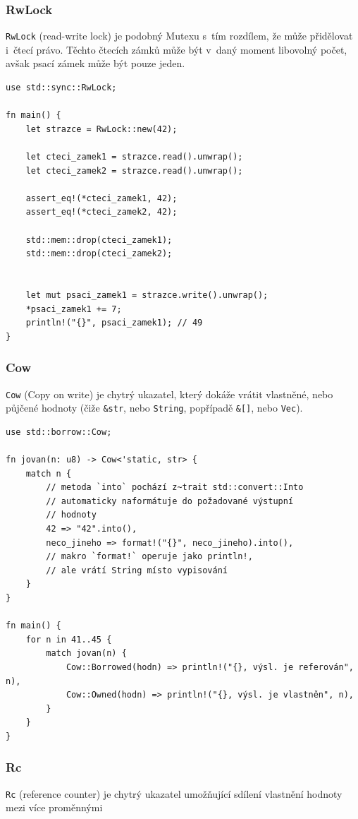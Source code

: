 \documentclass[a4paper, 12pt]{article} %
\newcommand{\rust}[1]{\texttt{#1}}
\begin{document}
			\subsubsection*{RwLock}
				\rust{RwLock} (read-write lock) je podobný Mutexu s~tím rozdílem, že může přidělovat i~čtecí právo. Těchto čtecích zámků může být v~daný moment libovolný počet, avšak psací zámek může být pouze jeden.
				\begin{verbatim}
use std::sync::RwLock;

fn main() {
	let strazce = RwLock::new(42);

	let cteci_zamek1 = strazce.read().unwrap();
	let cteci_zamek2 = strazce.read().unwrap();

	assert_eq!(*cteci_zamek1, 42);
	assert_eq!(*cteci_zamek2, 42);

	std::mem::drop(cteci_zamek1);
	std::mem::drop(cteci_zamek2);


	let mut psaci_zamek1 = strazce.write().unwrap();
	*psaci_zamek1 += 7;
	println!("{}", psaci_zamek1); // 49
}
				\end{verbatim}
				
			\subsubsection*{Cow}
				\rust{Cow} (Copy on write) je chytrý ukazatel, který dokáže vrátit vlastněné, nebo půjčené hodnoty (čiže \rust{&str}, nebo \rust{String}, popřípadě \rust{&[]}, nebo \rust{Vec}).
				\begin{verbatim}
use std::borrow::Cow;

fn jovan(n: u8) -> Cow<'static, str> {
	match n {
		// metoda `into` pochází z~trait std::convert::Into
		// automaticky naformátuje do požadované výstupní
		// hodnoty
		42 => "42".into(),
		neco_jineho => format!("{}", neco_jineho).into(),
		// makro `format!` operuje jako println!,
		// ale vrátí String místo vypisování
	}
}

fn main() {
	for n in 41..45 {
		match jovan(n) {
			Cow::Borrowed(hodn) => println!("{}, výsl. je referován", n),
			Cow::Owned(hodn) => println!("{}, výsl. je vlastněn", n),
		}
	}
}
				\end{verbatim}
				\cite{cow}


			\subsubsection*{Rc}
				\rust{Rc} (reference counter) je chytrý ukazatel umožňující sdílení vlastnění hodnoty mezi více proměnnými
			
\end{document}
